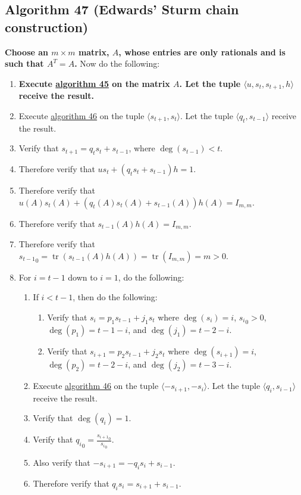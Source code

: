 \documentclass[twocolumn]{article}
\DeclareMathOperator{\tr}{tr}
\begin{document}
		\subsection{Algorithm 47 (Edwards' Sturm chain construction)}\label{sec:algorithm 47}
			\textbf{Choose an $m\times m$ matrix, $A$, whose entries are only rationals and is such that $A^T=A$.} Now do the following:
			\begin{enumerate}
				\item \textbf{Execute \hyperref[sec:algorithm 45]{algorithm 45} on the matrix $A$. Let the tuple $\langle u,s_t,s_{t+1},h\rangle$ receive the result.}
				\item Execute \hyperref[sec:algorithm 46]{algorithm 46} on the tuple $\langle s_{t+1},s_t\rangle$. Let the tuple $\langle q_t,s_{t-1}\rangle$ receive the result.
				\item Verify that $s_{t+1}=q_ts_t+s_{t-1}$, where $\deg(s_{t-1})<t$.
				\item Therefore verify that $us_t+(q_ts_t+s_{t-1})h=1$.
				\item Therefore verify that $u(A)s_t(A)+(q_t(A)s_t(A)+s_{t-1}(A))h(A)=I_{m,m}$.
				\item Therefore verify that $s_{t-1}(A)h(A)=I_{m,m}$.
				\item Therefore verify that ${s_{t-1}}_0=\tr(s_{t-1}(A)h(A))=\tr(I_{m,m})=m>0$.
				\item For $i=t-1$ down to $i=1$, do the following:
				\begin{enumerate}
					\item If $i<t-1$, then do the following:
					\begin{enumerate}
						\item Verify that $s_i=p_1s_{t-1}+j_1s_t$ where $\deg(s_i)=i$, ${s_i}_0>0$, $\deg(p_1)=t-1-i$, and $\deg(j_1)=t-2-i$.
						\item Verify that $s_{i+1}=p_2s_{t-1}+j_2s_t$ where $\deg(s_{i+1})=i$, $\deg(p_2)=t-2-i$, and $\deg(j_2)=t-3-i$.
					\end{enumerate}
					\item Execute \hyperref[sec:algorithm 46]{algorithm 46} on the tuple $\langle -s_{i+1},-s_i\rangle$. Let the tuple $\langle q_i,s_{i-1}\rangle$ receive the result.
					\item Verify that $\deg(q_i)=1$.
					\item Verify that ${q_i}_0=\frac{{s_{i+1}}_0}{{s_i}_0}$.
					\item Also verify that $-s_{i+1}=-q_is_i+s_{i-1}$.
					\item Therefore verify that $q_is_i=s_{i+1}+s_{i-1}$.

\end{enumerate}
\end{enumerate}
\end{document}
